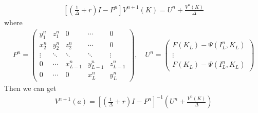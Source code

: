 \documentclass{article}
\begin{document}
\begin{CJK}{UTF8}{min}
\begin{align*}
\left[\left(\frac{1}{\Delta } +r\right)I-P^n\right]V^{n+1}(K)=U^n+\frac{V^n(K)}{\Delta }
\end{align*}
where
\begin{align*}
P^n=\begin{pmatrix}y_1^n&z_1^n&0&\cdots&0\\x_2^n&y_2^n&z_2^n&\cdots&0\\\vdots&\ddots&\ddots&\ddots&\vdots\\0&\cdots&x^n_{L-1}&y^n_{L-1}&z^n_{L-1}\\0&\cdots&0&x^n_L&y^n_L
\end{pmatrix},\quad
U^n=\begin{pmatrix}
F(K_L)-\Psi(I_L^n,K_L)\\\vdots\\F(K_L)-\Psi(I_L^n,K_L)
\end{pmatrix}
\end{align*}
Then we can get 
\begin{align*}
V^{n+1}(a)=\left[\left(\frac{1}{\Delta } +r\right)I-P^n\right]^{-1}\left(U^n+\frac{V^n(K)}{\Delta }\right)
\end{align*}
\end{CJK}
\end{document}
